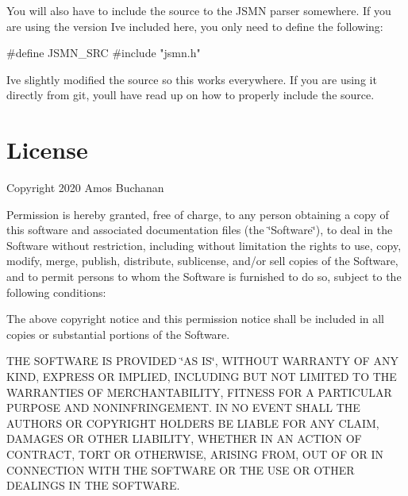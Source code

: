 You will also have to include the source to the J\+S\+MN parser somewhere. If you are using the version I\textquotesingle{}ve included here, you only need to define the following\+:


\begin{DoxyCode}
\textcolor{preprocessor}{#define JSMN\_SRC}
\textcolor{preprocessor}{#include "jsmn.h"}
\end{DoxyCode}


I\textquotesingle{}ve slightly modified the source so this works everywhere. If you are using it directly from git, you\textquotesingle{}ll have read up on how to properly include the source.

\section*{License}

Copyright 2020 Amos Buchanan

Permission is hereby granted, free of charge, to any person obtaining a copy of this software and associated documentation files (the \char`\"{}\+Software\char`\"{}), to deal in the Software without restriction, including without limitation the rights to use, copy, modify, merge, publish, distribute, sublicense, and/or sell copies of the Software, and to permit persons to whom the Software is furnished to do so, subject to the following conditions\+:

The above copyright notice and this permission notice shall be included in all copies or substantial portions of the Software.

T\+HE S\+O\+F\+T\+W\+A\+RE IS P\+R\+O\+V\+I\+D\+ED \char`\"{}\+A\+S I\+S\char`\"{}, W\+I\+T\+H\+O\+UT W\+A\+R\+R\+A\+N\+TY OF A\+NY K\+I\+ND, E\+X\+P\+R\+E\+SS OR I\+M\+P\+L\+I\+ED, I\+N\+C\+L\+U\+D\+I\+NG B\+UT N\+OT L\+I\+M\+I\+T\+ED TO T\+HE W\+A\+R\+R\+A\+N\+T\+I\+ES OF M\+E\+R\+C\+H\+A\+N\+T\+A\+B\+I\+L\+I\+TY, F\+I\+T\+N\+E\+SS F\+OR A P\+A\+R\+T\+I\+C\+U\+L\+AR P\+U\+R\+P\+O\+SE A\+ND N\+O\+N\+I\+N\+F\+R\+I\+N\+G\+E\+M\+E\+NT. IN NO E\+V\+E\+NT S\+H\+A\+LL T\+HE A\+U\+T\+H\+O\+RS OR C\+O\+P\+Y\+R\+I\+G\+HT H\+O\+L\+D\+E\+RS BE L\+I\+A\+B\+LE F\+OR A\+NY C\+L\+A\+IM, D\+A\+M\+A\+G\+ES OR O\+T\+H\+ER L\+I\+A\+B\+I\+L\+I\+TY, W\+H\+E\+T\+H\+ER IN AN A\+C\+T\+I\+ON OF C\+O\+N\+T\+R\+A\+CT, T\+O\+RT OR O\+T\+H\+E\+R\+W\+I\+SE, A\+R\+I\+S\+I\+NG F\+R\+OM, O\+UT OF OR IN C\+O\+N\+N\+E\+C\+T\+I\+ON W\+I\+TH T\+HE S\+O\+F\+T\+W\+A\+RE OR T\+HE U\+SE OR O\+T\+H\+ER D\+E\+A\+L\+I\+N\+GS IN T\+HE S\+O\+F\+T\+W\+A\+RE. 